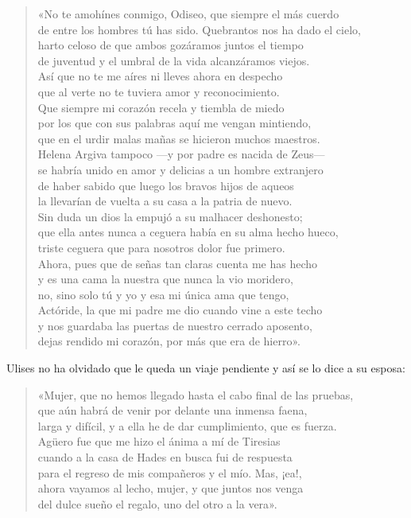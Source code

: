 \begin{verse}
«No te amohínes conmigo, Odiseo, que siempre el más cuerdo\\
de entre los hombres tú has sido. Quebrantos nos ha dado el cielo,\\
harto celoso de que ambos gozáramos juntos el tiempo\\
de juventud y el umbral de la vida alcanzáramos viejos.\\
Así que no te me aíres ni lleves ahora en despecho\\
que al verte no te tuviera amor y reconocimiento.\\
Que siempre mi corazón recela y tiembla de miedo\\
por los que con sus palabras aquí me vengan mintiendo,\\
que en el urdir malas mañas se hicieron muchos maestros.\\
Helena Argiva tampoco ---y por padre es nacida de Zeus---\\
se habría unido en amor y delicias a un hombre extranjero\\
de haber sabido que luego los bravos hijos de aqueos\\
la llevarían de vuelta a su casa a la patria de nuevo.\\
Sin duda un dios la empujó a su malhacer deshonesto;\\
que ella antes nunca a ceguera había en su alma hecho hueco,\\
triste ceguera que para nosotros dolor fue primero.\\
Ahora, pues que de señas tan claras cuenta me has hecho\\
y es una cama la nuestra que nunca la vio moridero,\\
no, sino solo tú y yo y esa mi única ama que tengo,\\
Actóride, la que mi padre me dio cuando vine a este techo\\
y nos guardaba las puertas de nuestro cerrado aposento,\\
dejas rendido mi corazón, por más que era de hierro».
\end{verse}

Ulises no ha olvidado que le queda un viaje pendiente y así se lo dice a su esposa:

\begin{verse}
«Mujer, que no hemos llegado hasta el cabo final de las pruebas,\\
que aún habrá de venir por delante una inmensa faena,\\
larga y difícil, y a ella he de dar cumplimiento, que es fuerza.\\
Agüero fue que me hizo el ánima a mí de Tiresias\\
cuando a la casa de Hades en busca fui de respuesta\\
para el regreso de mis compañeros y el mío. Mas, ¡ea!,\\
ahora vayamos al lecho, mujer, y que juntos nos venga\\
del dulce sueño el regalo, uno del otro a la vera».
\end{verse}

